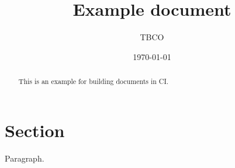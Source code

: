 \documentclass{article}
\title{Example document}
\author{TBCO}
\date{\today}
\begin{document}
\maketitle


\begin{abstract}
This is an example for building documents in CI.
\end{abstract}

\section{Section}

Paragraph.
\end{document}
